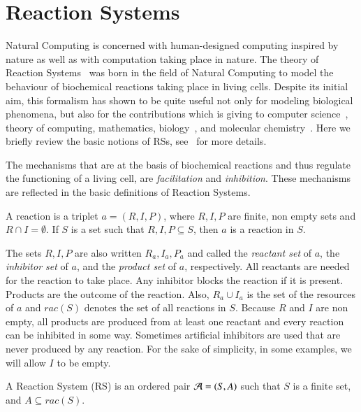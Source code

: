 
\section{Reaction Systems}
\label{sec:rs}

Natural Computing is concerned with human-designed computing inspired by 
nature as well as with computation taking place in nature.
The theory of Reaction Systems~\cite{BEMR11} 
was born in the field of Natural Computing 
to model the behaviour of biochemical reactions taking place in living cells. 
Despite its initial aim, this formalism has shown to be quite useful 
not only for modeling biological phenomena, but also for
the contributions which is giving to computer science~\cite{MPR15}, 
theory of computing, 
mathematics, biology~\cite{ABP14,CMMBM12,Az17,BarbutiGLM16}, 
and molecular chemistry~\cite{OY16}.
%
Here we briefly review the basic notions of RSs, see~\cite{BEMR11} for more details.

The mechanisms that are at the basis of biochemical reactions and thus 
regulate the functioning of a living cell, are 
{\em facilitation} and {\em inhibition}. These mechanisms are 
reflected in the basic definitions of Reaction Systems.

\begin{definition}[Reaction]
A reaction is a triplet $a = (R,I,P)$, where $R, I, P$ are finite,  
non empty sets  and
$R \cap I = \emptyset$. If $S$ is a set such that  $R, I, P \subseteq S$, 
then $a$ is a reaction in $S$.
\end{definition}

The sets $R, I, P$ are also written $R_a, I_a, P_a$ and called the 
\emph{reactant set} of $a$, the  
\emph{inhibitor set} of $a$, and the \emph{product set} of $a$, respectively. 
All reactants are needed for the reaction to take place.
Any inhibitor blocks the reaction if it is present. Products are the outcome of the reaction.
Also,  $R_a \cup I_a$ is the set of the resources of $a$ and $ rac(S)$
denotes the set of all reactions in $S$.
%
Because $R$ and $I$ are non empty, all products are produced from at least one reactant and every reaction can be inhibited in some way. 
Sometimes artificial inhibitors are used that are never produced by any reaction.
For the sake of simplicity, in some examples, we will allow $I$ to be empty.

\begin{definition}
A Reaction System (RS) is an ordered pair ${\cal A} = (S, A)$ 
such that $S$ is a finite set, and $A \subseteq rac(S)$.
\end{definition}

